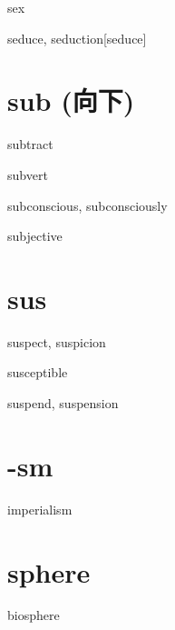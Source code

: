 \begin{RefWord}{sex}
\end{RefWord}

\begin{RefWord}{seduce, seduction}[seduce]
\end{RefWord}


\section{sub (向下)}

\begin{RefWord}{subtract}
\end{RefWord}

\begin{RefWord}{subvert}
\end{RefWord}

\begin{RefWord}{subconscious, subconsciously}
\end{RefWord}

\begin{RefWord}{subjective}
\end{RefWord}

\section{sus}

\begin{RefWord}{suspect, suspicion}
\end{RefWord}

\begin{RefWord}{susceptible}
\end{RefWord}

\begin{RefWord}{suspend, suspension}
\end{RefWord}

\section{-sm}

\begin{RefWord}{imperialism}
\end{RefWord}

\section{sphere}
\begin{RefWord}{biosphere}
\end{RefWord}

